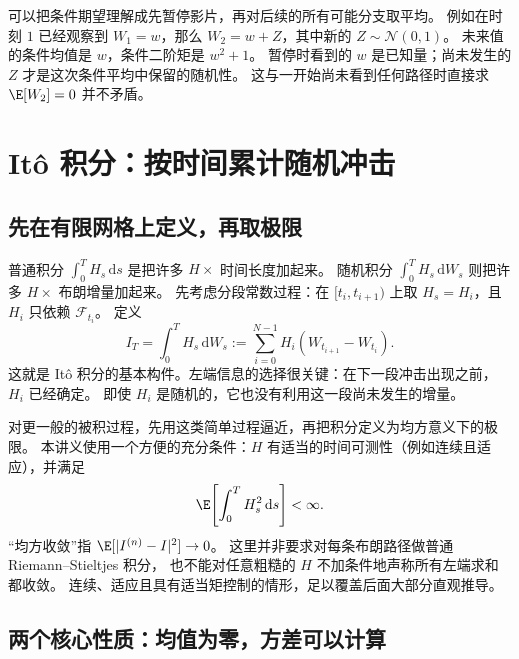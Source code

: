 可以把条件期望理解成先暂停影片，再对后续的所有可能分支取平均。
例如在时刻 $1$ 已经观察到 $W_1=w$，那么 $W_2=w+Z$，其中新的 $Z\sim\mathcal N(0,1)$。
未来值的条件均值是 $w$，条件二阶矩是 $w^2+1$。
暂停时看到的 $w$ 是已知量；尚未发生的 $Z$ 才是这次条件平均中保留的随机性。
这与一开始尚未看到任何路径时直接求 $\E[W_2]=0$ 并不矛盾。

\section{It\^o 积分：按时间累计随机冲击}
\label{bg:sec:ito-integral}

\subsection{先在有限网格上定义，再取极限}
\label{bg:sub:left-sum}

普通积分 $\int_0^T H_s\,\mathrm ds$ 是把许多 $H\times$ 时间长度加起来。
随机积分 $\int_0^T H_s\,\mathrm dW_s$ 则把许多 $H\times$ 布朗增量加起来。
先考虑分段常数过程：在 $[t_i,t_{i+1})$ 上取 $H_s=H_i$，且 $H_i$ 只依赖 $\mathcal F_{t_i}$。
定义
\begin{equation}
  I_T=\int_0^T H_s\,\mathrm dW_s
  :=\sum_{i=0}^{N-1}H_i(W_{t_{i+1}}-W_{t_i}).
  \label{bg:eq:ito-simple-definition}
\end{equation}
这就是 It\^o 积分的基本构件。左端信息的选择很关键：在下一段冲击出现之前，$H_i$ 已经确定。
即使 $H_i$ 是随机的，它也没有利用这一段尚未发生的增量。

对更一般的被积过程，先用这类简单过程逼近，再把积分定义为均方意义下的极限。
本讲义使用一个方便的充分条件：$H$ 有适当的时间可测性（例如连续且适应），并满足
\begin{equation}
  \E\!\left[\int_0^T H_s^2\,\mathrm ds\right]<\infty.
  \label{bg:eq:ito-square-integrable}
\end{equation}
“均方收敛”指 $\E[|I^{(n)}-I|^2]\to0$。
这里并非要求对每条布朗路径做普通 Riemann--Stieltjes 积分，
也不能对任意粗糙的 $H$ 不加条件地声称所有左端求和都收敛。
连续、适应且具有适当矩控制的情形，足以覆盖后面大部分直观推导。

\subsection{两个核心性质：均值为零，方差可以计算}
\label{bg:sub:isometry}

